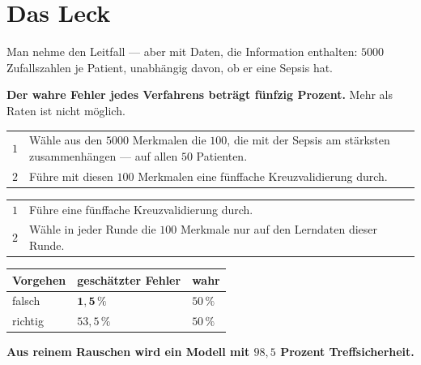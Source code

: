 \section{Das Leck}

\begin{warnung}
Man nehme den Leitfall --- aber mit Daten, die  Information enthalten: $5000$ Zufallszahlen je Patient, unabhängig davon, ob er eine Sepsis hat.

\begin{center}
\begin{minipage}{0.9\textwidth}
\textbf{Der wahre Fehler jedes Verfahrens beträgt fünfzig Prozent.} Mehr als Raten ist nicht möglich.
\end{minipage}
\end{center}

\begin{center}
{\small
\renewcommand{\arraystretch}{1.5}
\begin{tabular}{@{}P{1.0cm}P{7.4cm}@{}}
\toprule
$1$ & Wähle aus den $5000$ Merkmalen die $100$, die mit der Sepsis am stärksten zusammenhängen --- auf \textcolor{akzent}{allen} $50$ Patienten.\\
$2$ & Führe mit diesen $100$ Merkmalen eine fünffache Kreuzvalidierung durch.\\
\bottomrule
\end{tabular}}
\end{center}

\begin{center}
{\small
\renewcommand{\arraystretch}{1.5}
\begin{tabular}{@{}P{1.0cm}P{7.4cm}@{}}
\toprule
$1$ & Führe eine fünffache Kreuzvalidierung durch.\\
$2$ & Wähle in \textcolor{gruen}{jeder Runde} die $100$ Merkmale nur auf den Lerndaten dieser Runde.\\
\bottomrule
\end{tabular}}
\end{center}

\begin{center}
{\small
\renewcommand{\arraystretch}{1.5}
\begin{tabular}{@{}P{3.0cm}P{2.6cm}P{2.4cm}@{}}
\toprule
\textbf{Vorgehen} & \textbf{geschätzter Fehler} & \textbf{wahr}\\
\midrule
falsch & $\mathbf{1{,}5\,\%}$ & $50\,\%$\\
richtig & $53{,}5\,\%$ & $50\,\%$\\
\bottomrule
\end{tabular}}
\end{center}

\begin{center}
\begin{minipage}{0.9\textwidth}
\textbf{Aus reinem Rauschen wird ein Modell mit $98{,}5$ Prozent Treffsicherheit.}
\end{minipage}
\end{center}
\end{warnung}

